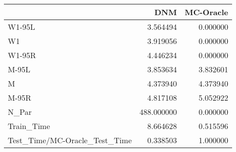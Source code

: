 \begin{tabular}{lrr}
\toprule
{} &         DNM &  MC-Oracle \\
\midrule
W1-95L                        &    3.564494 &   0.000000 \\
W1                            &    3.919056 &   0.000000 \\
W1-95R                        &    4.446234 &   0.000000 \\
M-95L                         &    3.853634 &   3.832601 \\
M                             &    4.373940 &   4.373940 \\
M-95R                         &    4.817108 &   5.052922 \\
N\_Par                         &  488.000000 &   0.000000 \\
Train\_Time                    &    8.664628 &   0.515596 \\
Test\_Time/MC-Oracle\_Test\_Time &    0.338503 &   1.000000 \\
\bottomrule
\end{tabular}
